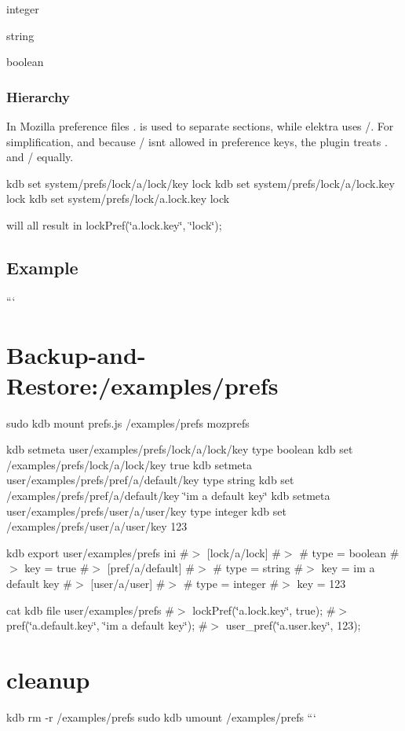 \begin{DoxyItemize}
\item {\ttfamily integer}
\item {\ttfamily string}
\item {\ttfamily boolean}
\end{DoxyItemize}

\subsubsection*{Hierarchy}

In Mozilla preference files {\ttfamily .} is used to separate sections, while elektra uses {\ttfamily /}. For simplification, and because {\ttfamily /} isn\textquotesingle{}t allowed in preference keys, the plugin treats {\ttfamily .} and {\ttfamily /} equally. \begin{DoxyVerb}kdb set system/prefs/lock/a/lock/key lock
kdb set system/prefs/lock/a/lock.key lock
kdb set system/prefs/lock/a.lock.key lock
\end{DoxyVerb}


will all result in {\ttfamily lock\+Pref(\char`\"{}a.\+lock.\+key\char`\"{}, \char`\"{}lock\char`\"{});}

\subsection*{Example}

``` \section*{Backup-\/and-\/\+Restore\+:/examples/prefs}

sudo kdb mount prefs.\+js /examples/prefs mozprefs

kdb setmeta user/examples/prefs/lock/a/lock/key type boolean kdb set /examples/prefs/lock/a/lock/key true kdb setmeta user/examples/prefs/pref/a/default/key type string kdb set /examples/prefs/pref/a/default/key \char`\"{}i\textquotesingle{}m a default key\char`\"{} kdb setmeta user/examples/prefs/user/a/user/key type integer kdb set /examples/prefs/user/a/user/key 123

kdb export user/examples/prefs ini \#$>$ \mbox{[}lock/a/lock\mbox{]} \#$>$ \# type = boolean \#$>$ key = true \#$>$ \mbox{[}pref/a/default\mbox{]} \#$>$ \# type = string \#$>$ key = i\textquotesingle{}m a default key \#$>$ \mbox{[}user/a/user\mbox{]} \#$>$ \# type = integer \#$>$ key = 123

cat {\ttfamily kdb file user/examples/prefs} \#$>$ lock\+Pref(\char`\"{}a.\+lock.\+key\char`\"{}, true); \#$>$ pref(\char`\"{}a.\+default.\+key\char`\"{}, \char`\"{}i\textquotesingle{}m a default key\char`\"{}); \#$>$ user\+\_\+pref(\char`\"{}a.\+user.\+key\char`\"{}, 123);

\section*{cleanup}

kdb rm -\/r /examples/prefs sudo kdb umount /examples/prefs ``` 